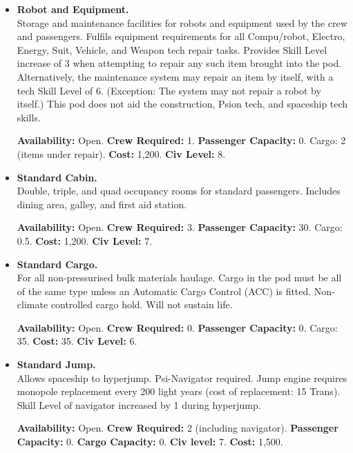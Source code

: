 \begin{itemize}
  

\item\textbf{Robot and Equipment.}\\
  Storage and maintenance facilities for robots and equipment used by
  the crew and passengers. Fulfils equipment requirements for all
  Compu/robot, Electro, Energy, Suit, Vehicle, and Weapon tech repair
  tasks. Provides Skill Level increase of 3 when attempting to repair
  any such item brought into the pod. Alternatively, the maintenance
  system may repair an item by itself, with a tech Skill Level of 6.
  (Exception: The system may not repair a robot by itself.) This pod
  does not aid the construction, Psion tech, and spaceship tech skills.

  
  \textbf{Availability:} Open. \textbf{Crew Required:} 1.
  \textbf{Passenger Capacity:} 0. Cargo: 2 (items under repair).
  \textbf{Cost:} 1,200. \textbf{Civ Level:} 8.
  
  

\item\textbf{Standard Cabin.}\\
  Double, triple, and quad occupancy rooms for standard passengers.
  Includes dining area, galley, and first aid station.

  
  \textbf{Availability:} Open. \textbf{Crew Required:} 3.
  \textbf{Passenger Capacity:} 30. Cargo: 0.5. \textbf{Cost:} 1,200.
  \textbf{Civ Level:} 7.
  
  

\item\textbf{Standard Cargo.}\\
  For all non-pressurised bulk materials haulage. Cargo in the pod
  must be all of the same type unless an Automatic Cargo Control (ACC)
  is fitted. Non-climate controlled cargo hold. Will not sustain life.

  
  \textbf{Availability:} Open. \textbf{Crew Required:} 0.
  \textbf{Passenger Capacity:} 0. Cargo: 35. \textbf{Cost:} 35.
  \textbf{Civ Level:} 6.
  
  

\item\textbf{Standard Jump.}\\
  Allows spaceship to hyperjump. Psi-Navigator required. Jump engine
  requires monopole replacement every 200 light years (cost of
  replacement: 15 Trans). Skill Level of navigator increased by 1
  during hyperjump.

  
  \textbf{Availability:} Open. \textbf{Crew Required:} 2 (including
  navigator).  \textbf{Passenger Capacity:} 0. \textbf{Cargo
  Capacity:} 0.  \textbf{Civ level:} 7.
  \textbf{Cost:} 1,500.
  

\end{itemize}
